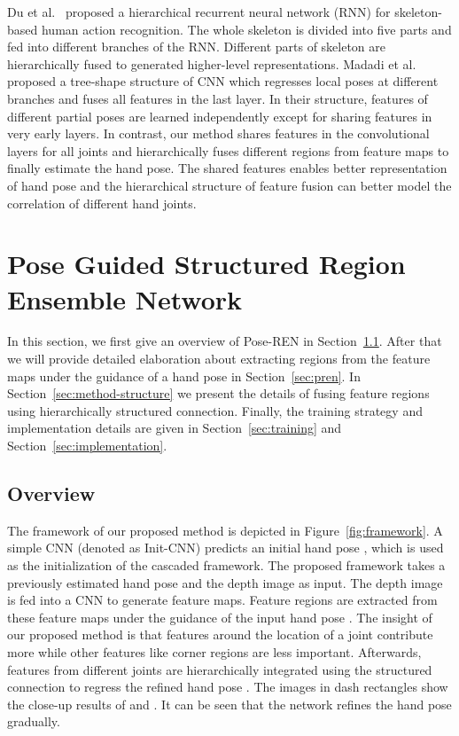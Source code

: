 \documentclass[final, 5p]{elsarticle}
\begin{document}
Du et al.~\cite{du2015hierarchical} proposed a hierarchical recurrent neural network (RNN) for skeleton-based human action recognition. The whole skeleton is divided into five parts and fed into different branches of the RNN. Different parts of skeleton are hierarchically fused to generated higher-level representations.
Madadi et al.~\cite{madadi2017end} proposed a tree-shape structure of CNN which regresses local poses at different branches and fuses all features in the last layer. In their structure, features of different partial poses are learned independently except for sharing features in very early layers. In contrast, our method shares features in the convolutional layers for all joints and hierarchically fuses different regions from feature maps to finally estimate the hand pose. The shared  features enables better representation of hand pose and the hierarchical structure of feature fusion can better model the correlation of different hand joints.


\section{Pose Guided Structured Region Ensemble Network}
\label{sec:method}
In this section, we first give an overview of Pose-REN in Section~\ref{sec:method-overview}. After that we will provide detailed elaboration about extracting regions from the feature maps under the guidance of a hand pose in Section~\ref{sec:pren}. In Section~\ref{sec:method-structure} we present the details of fusing feature regions using hierarchically structured connection. Finally, the training strategy and implementation details are given in Section~\ref{sec:training} and Section~\ref{sec:implementation}.

\subsection{Overview}
\label{sec:method-overview}
The framework of our proposed method is depicted in Figure~\ref{fig:framework}. A simple CNN (denoted as Init-CNN) predicts an initial hand pose , which is used as the initialization of the cascaded framework. The proposed framework takes a previously estimated hand pose  and the depth image as input. The depth image is fed into a CNN to generate feature maps. Feature regions are extracted from these feature maps under the guidance of the input hand pose . The insight of our proposed method is that features around the location of a joint contribute more while other features like corner regions are less important. Afterwards, features from different joints are hierarchically integrated using the structured connection to regress the refined hand pose . The images in dash rectangles show the close-up results of  and . It can be seen that the network refines the hand pose gradually.
\end{document}
